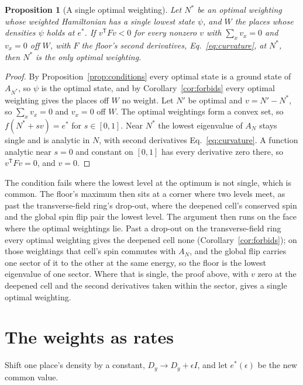 \documentclass[aps,prd,reprint,superscriptaddress]{revtex4-2}
\newtheorem{proposition}{Proposition}
\begin{document}
\begin{proposition}[A single optimal weighting]\label{prop:single}
Let $N^*$ be an optimal weighting whose weighted Hamiltonian has a single lowest state $\psi$, and $W$ the places whose densities $\psi$ holds at $e^*$. If $v^{\mathsf T} F v < 0$ for every nonzero $v$ with $\sum_x v_x = 0$ and $v_x = 0$ off $W$, with $F$ the floor's second derivatives, Eq.~\eqref{eq:curvature}, at $N^*$, then $N^*$ is the only optimal weighting.
\end{proposition}
\begin{proof}
By Proposition~\ref{prop:conditions} every optimal state is a ground state of $A_{N^*}$, so $\psi$ is the optimal state, and by Corollary~\ref{cor:forbids} every optimal weighting gives the places off $W$ no weight. Let $N'$ be optimal and $v = N' - N^*$, so $\sum_x v_x = 0$ and $v_x = 0$ off $W$. The optimal weightings form a convex set, so $f(N^* + sv) = e^*$ for $s \in [0, 1]$. Near $N^*$ the lowest eigenvalue of $A_N$ stays single and is analytic in $N$, with second derivatives Eq.~\eqref{eq:curvature}. A function analytic near $s = 0$ and constant on $[0, 1]$ has every derivative zero there, so $v^{\mathsf T} F v = 0$, and $v = 0$.
\end{proof}
The condition fails where the lowest level at the optimum is not single, which is common. The floor's maximum then sits at a corner where two levels meet, as past the transverse-field ring's drop-out, where the deepened cell's conserved spin and the global spin flip pair the lowest level. The argument then runs on the face where the optimal weightings lie. Past a drop-out on the transverse-field ring every optimal weighting gives the deepened cell none (Corollary~\ref{cor:forbids}); on those weightings that cell's spin commutes with $A_N$, and the global flip carries one sector of it to the other at the same energy, so the floor is the lowest eigenvalue of one sector. Where that is single, the proof above, with $v$ zero at the deepened cell and the second derivatives taken within the sector, gives a single optimal weighting.

\section{The weights as rates}
\label{app:rates}

Shift one place's density by a constant, $D_y \to D_y + \epsilon I$, and let $e^*(\epsilon)$ be the new common value.
\end{document}
